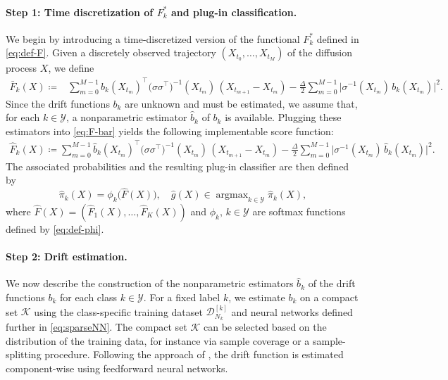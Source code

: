 \documentclass{article}
\theoremstyle{plain}
\theoremstyle{definition}
\theoremstyle{remark}
\newcommand{\calY}{\mathcal{Y}}
\DeclareMathOperator*{\argmax}{argmax}
\begin{document}
\paragraph{Step 1: Time discretization of $F_k^*$ and plug-in classification.}
We begin by introducing a time-discretized version of the functional $F_k^*$ defined in \eqref{eq:def-F}. Given a discretely observed trajectory $(X_{t_0}, \dots, X_{t_{M}})$ of the diffusion process $X$, we define 
\begin{align}\label{eq:F-bar}
\bar{F}_k(X)
\coloneqq
&\sum_{m=0}^{M-1} b_k(X_{t_m})^{\top} \big(\sigma\sigma^{\top}\big)^{-1}(X_{t_m})\,(X_{t_{m+1}}\!\!-X_{t_m}) -\frac{\Delta}{2}\sum_{m=0}^{M-1} \big\lvert \sigma^{-1} (X_{t_m})\,b_k(X_{t_m}) \big\rvert^2.
\end{align}
Since the drift functions \( b_k \) are unknown and must be estimated, we assume that, for each \( k \in \mathcal Y \), a nonparametric estimator \( \widehat b_k \) of \( b_k \) is available. Plugging these estimators into \eqref{eq:F-bar} yields the following implementable score function:
\begin{align}\label{eq:F-hat}
\!\!\!\widehat{F}_k(X)
\coloneqq
\sum_{m=0}^{M-1} \widehat{b}_k(X_{t_m})^{\top} \big(\sigma\sigma^{\top}\big)^{-1}(X_{t_m})\,(X_{t_{m+1}}\!\!-X_{t_m}) -\frac{\Delta}{2}\sum_{m=0}^{M-1} \big\lvert \sigma^{-1} (X_{t_m})\,\widehat{b}_k(X_{t_m}) \big\rvert^2.
\end{align}
The associated probabilities and the resulting plug-in classifier are then defined by
\begin{equation}\label{eq:def-pi-hat-g-hat}
\widehat\pi_k(X) = \phi_k\big( \widehat{F}(X) \big), \quad \widehat g(X)\in\argmax_{k\in\mathcal{Y}} \widehat \pi_k(X),
\end{equation}
where $\widehat{F}(X)=(\widehat{F}_1(X),\dots, \widehat{F}_K(X))$ and $\phi_k,\,k\in\calY$ are softmax functions defined by \eqref{eq:def-phi}. 





\paragraph{Step 2: Drift estimation.}  
We now describe the construction of the nonparametric estimators \( \widehat b_k \) of the drift functions \( b_k \) for each class \( k \in \mathcal Y \).
For a fixed label \( k \), we estimate \( b_k \) on a compact set $\mathcal{K}$ using the class-specific training dataset \( \mathcal D_{N_k}^{[k]} \) and neural networks defined further in \eqref{eq:sparseNN}. The compact set \(\mathcal K\) can be selected based on the distribution of the training data, for instance via sample coverage or a sample-splitting procedure. 
Following the approach of \citet{zhao2025drift}, the drift function is estimated component-wise using feedforward neural networks.
\end{document}
